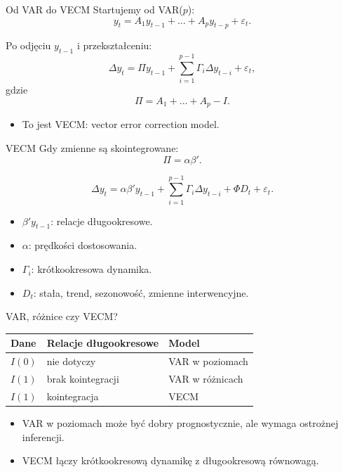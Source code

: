 \documentclass[11pt,aspectratio=169,xcolor=dvipsnames]{beamer}
\begin{document}
\begin{frame}{Od VAR do VECM}
  Startujemy od VAR($p$):
  \[
    y_t = A_1y_{t-1} + \ldots + A_py_{t-p} + \varepsilon_t.
  \]

  Po odjęciu $y_{t-1}$ i przekształceniu:
  \[
    \Delta y_t
      = \Pi y_{t-1}
      + \sum_{i=1}^{p-1}\Gamma_i\Delta y_{t-i}
      + \varepsilon_t,
  \]
  gdzie
  \[
    \Pi = A_1 + \ldots + A_p - I.
  \]

  \begin{itemize}
    \item To jest VECM: vector error correction model.
  \end{itemize}
\end{frame}

\begin{frame}{VECM}
  Gdy zmienne są skointegrowane:
  \[
    \Pi = \alpha\beta'.
  \]

  \[
    \Delta y_t
      = \alpha\beta'y_{t-1}
      + \sum_{i=1}^{p-1}\Gamma_i\Delta y_{t-i}
      + \Phi D_t
      + \varepsilon_t.
  \]

  \begin{itemize}
    \item $\beta'y_{t-1}$: relacje długookresowe.
    \item $\alpha$: prędkości dostosowania.
    \item $\Gamma_i$: krótkookresowa dynamika.
    \item $D_t$: stała, trend, sezonowość, zmienne interwencyjne.
  \end{itemize}
\end{frame}

\begin{frame}{VAR, różnice czy VECM?}
  \begin{center}
    \begin{tabular}{lll}
      \toprule
      Dane & Relacje długookresowe & Model \\
      \midrule
      $I(0)$ & nie dotyczy & VAR w poziomach \\
      $I(1)$ & brak kointegracji & VAR w różnicach \\
      $I(1)$ & kointegracja & VECM \\
      \bottomrule
    \end{tabular}
  \end{center}

  \vspace{0.4cm}
  \begin{itemize}
    \item VAR w poziomach może być dobry prognostycznie, ale wymaga ostrożnej inferencji.
    \item VECM łączy krótkookresową dynamikę z długookresową równowagą.
  \end{itemize}
\end{frame}
\end{document}
